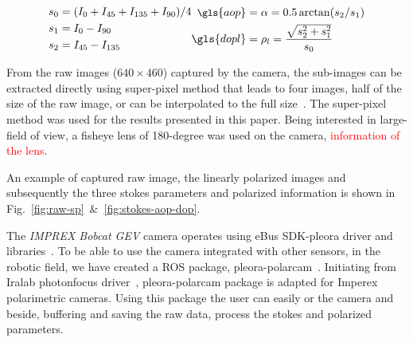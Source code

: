 \begin{subequations}
  \begin{align}
    \label{eq:stokes1}
    \small
    s_0 & = (I_0 + I_{45} + I_{135} + I_{90})/4\\ \nonumber
    s_1 & = I_0 - I_{90} \\ \nonumber
    s_2 & = I_{45} - I_{135} \nonumber
  \end{align}
  \begin{align}
    \label{eq:stokes2}
    \small
    \gls{aop} & = \alpha = 0.5 \arctan(s_2/s_1) \\ \nonumber
    \gls{dopl} & = \rho_l = \frac{\sqrt{s_2^{2} + s_1^{2}}}{s_0} \nonumber
  \end{align}
  \label{eq:stokes}
\end{subequations}

From the raw images ($640\times460$) captured by the camera, the sub-images can
be extracted directly using super-pixel method that leads to four images, half
of the size of the raw image, or can be interpolated to the full
size~\cite{ratliff2009interpolationmicrogrid,gao2011bilinearpolarimeters}.  The
super-pixel method was used for the results presented in this paper. Being
interested in large-field of view, a fisheye lens of 180-degree was used on the
camera, \textcolor{red}{information of the lens}.

An example of captured raw image, the linearly polarized
images and subsequently the three stokes parameters and polarized information
is shown in Fig.~\ref{fig:raw-sp}~$\&$~\ref{fig:stokes-aop-dop}.

The \textit{IMPREX Bobcat GEV} camera operates using eBus SDK-pleora driver and
libraries~\cite{eBus}. To be able to use the camera integrated with other
sensors, in the robotic field, we have created a ROS
package, pleora-polarcam~\cite{pleora_polarcam}.
Initiating from Iralab photonfocus driver~\cite{ira}, pleora-polarcam package
is adapted for Imperex polarimetric cameras.
Using this package the user can easily  or  the
camera and beside, buffering and saving the raw data, process the stokes and
polarized parameters.




